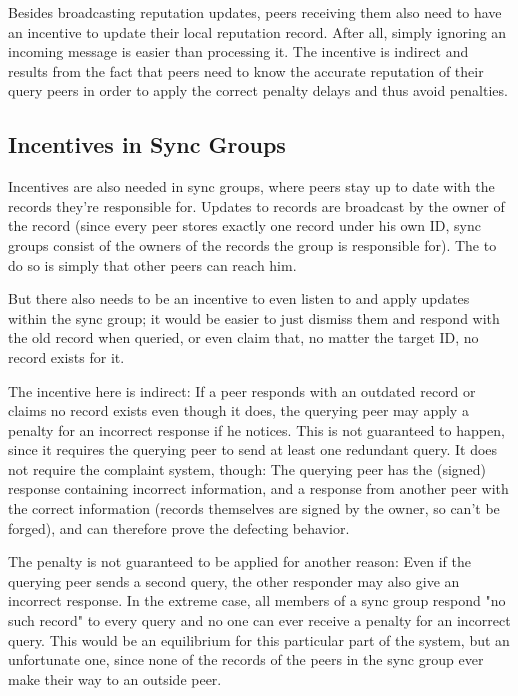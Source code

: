Besides broadcasting reputation updates, peers receiving them also need to have
an incentive to update their local reputation record. After all, simply ignoring
an incoming message is easier than processing it. The incentive is indirect and
results from the fact that peers need to know the accurate reputation of their
query peers in order to apply the correct penalty delays and thus avoid
penalties.

\subsection{Incentives in Sync Groups}
\label{sec:desc_incentives_sync}
Incentives are also needed in sync groups, where peers stay up to date with the
records they're responsible for. Updates to records are broadcast by the owner
of the record (since every peer stores exactly one record under his own ID, sync
groups consist of the owners of the records the group is responsible for). The
to do so is simply that other peers can reach him.

But there also needs to be an incentive to even listen to and apply updates
within the sync group; it would be easier to just dismiss them and respond with
the old record when queried, or even claim that, no matter the target ID, no
record exists for it.

The incentive here is indirect: If a peer responds with an outdated record or
claims no record exists even though it does, the querying peer may apply a
penalty for an incorrect response if he notices. This is not guaranteed to
happen, since it requires the querying peer to send at least one redundant
query. It does not require the complaint system, though: The querying peer has
the (signed) response containing incorrect information, and a response from
another peer with the correct information (records themselves are signed by the
owner, so can't be forged), and can therefore prove the defecting behavior.

The penalty is not guaranteed to be applied for another reason: Even if the
querying peer sends a second query, the other responder may also give an
incorrect response. In the extreme case, all members of a sync group respond "no
such record" to every query and no one can ever receive a penalty for an
incorrect query. This would be an equilibrium for this particular part of the
system, but an unfortunate one, since none of the records of the peers in the
sync group ever make their way to an outside peer.

